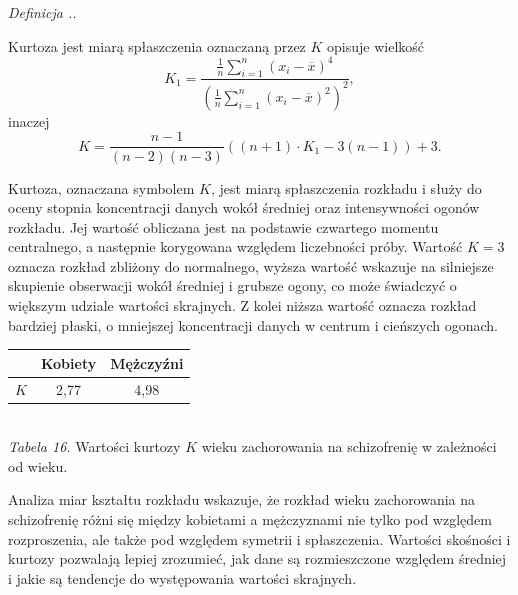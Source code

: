 \documentclass{mwart}
\newenvironment{defi}[1][]{
	\refstepcounter{definition}%
	\noindent\textit{Definicja \thesection.\thedefinition. #1}\par\nopagebreak\vspace{0.5em}\normalfont
}{\par\vspace{1em}}
\begin{document}
	\begin{defi}
		Kurtoza jest miarą spłaszczenia oznaczaną przez $K$ opisuje wielkość
		$$K_1=\frac{\frac{1}{n}\sum\limits_{i=1}^n(x_i-\overline{x})^4}{\left(\frac{1}{n}\sum\limits_{i=1}^n(x_i-\overline{x})^2 \right)^2 },$$
		inaczej
		$$K=\frac{n-1}{(n-2)(n-3)}\left((n+1)\cdot K_1 - 3(n-1) \right)+3. $$
	\end{defi}
	\noindent
	Kurtoza, oznaczana symbolem $K$, jest miarą spłaszczenia rozkładu i służy do oceny stopnia koncentracji danych wokół średniej oraz intensywności ogonów rozkładu.  Jej wartość obliczana jest na podstawie czwartego momentu centralnego, a następnie korygowana względem liczebności próby. Wartość $K=3$ oznacza rozkład zbliżony do normalnego, wyższa wartość wskazuje na silniejsze skupienie obserwacji wokół średniej i grubsze ogony, co może świadczyć o większym udziale wartości skrajnych. Z kolei niższa wartość oznacza rozkład bardziej płaski, o mniejszej koncentracji danych w centrum i cieńszych ogonach.
	\begin{center}
		\begin{tabular}{|c|c|c|}
			\hline
			&Kobiety&Mężczyźni\\
			\hline
			$K$&2,77&4,98\\
			\hline
		\end{tabular}\\
		\textit{Tabela 16.} Wartości kurtozy $K$ wieku zachorowania na schizofrenię w zależności od wieku.
	\end{center}
	Analiza miar kształtu rozkładu wskazuje, że rozkład wieku zachorowania na schizofrenię różni się między kobietami a mężczyznami nie tylko pod względem rozproszenia, ale także pod względem symetrii i spłaszczenia. Wartości skośności i kurtozy pozwalają lepiej zrozumieć, jak dane są rozmieszczone względem średniej i jakie są tendencje do występowania wartości skrajnych.
	
\end{document}
